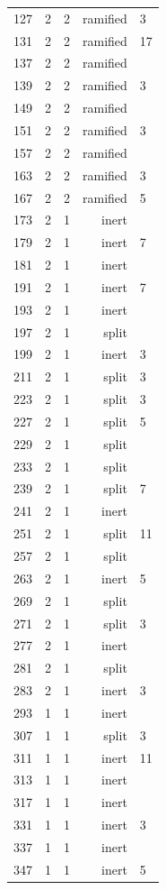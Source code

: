 \begin{longtable}{rrrrl}
127 & 2 & 2 & ramified & 3 \\
131 & 2 & 2 & ramified & 17 \\
137 & 2 & 2 & ramified &  \\
139 & 2 & 2 & ramified & 3 \\
149 & 2 & 2 & ramified &  \\
151 & 2 & 2 & ramified & 3 \\
157 & 2 & 2 & ramified &  \\
163 & 2 & 2 & ramified & 3 \\
167 & 2 & 2 & ramified & 5 \\
173 & 2 & 1 & inert &  \\
179 & 2 & 1 & inert & 7 \\
181 & 2 & 1 & inert &  \\
191 & 2 & 1 & inert & 7 \\
193 & 2 & 1 & inert &  \\
197 & 2 & 1 & split &  \\
199 & 2 & 1 & inert & 3 \\
211 & 2 & 1 & split & 3 \\
223 & 2 & 1 & split & 3 \\
227 & 2 & 1 & split & 5 \\
229 & 2 & 1 & split &  \\
233 & 2 & 1 & split &  \\
239 & 2 & 1 & split & 7 \\
241 & 2 & 1 & inert &  \\
251 & 2 & 1 & split & 11 \\
257 & 2 & 1 & split &  \\
263 & 2 & 1 & inert & 5 \\
269 & 2 & 1 & split &  \\
271 & 2 & 1 & split & 3 \\
277 & 2 & 1 & inert &  \\
281 & 2 & 1 & split &  \\
283 & 2 & 1 & inert & 3 \\
293 & 1 & 1 & inert &  \\
307 & 1 & 1 & split & 3 \\
311 & 1 & 1 & inert & 11 \\
313 & 1 & 1 & inert &  \\
317 & 1 & 1 & inert &  \\
331 & 1 & 1 & inert & 3 \\
337 & 1 & 1 & inert &  \\
347 & 1 & 1 & inert & 5 \\

\end{longtable}
